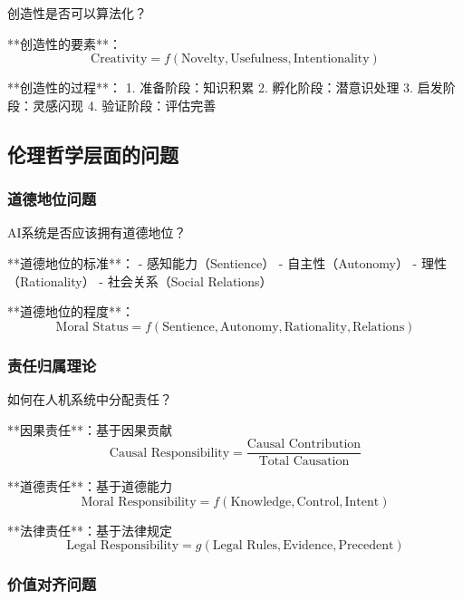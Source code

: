 创造性是否可以算法化？

**创造性的要素**：
\begin{equation}
\text{Creativity} = f(\text{Novelty}, \text{Usefulness}, \text{Intentionality})
\end{equation}

**创造性的过程**：
1. 准备阶段：知识积累
2. 孵化阶段：潜意识处理
3. 启发阶段：灵感闪现
4. 验证阶段：评估完善

\subsection{伦理哲学层面的问题}

\subsubsection{道德地位问题}

AI系统是否应该拥有道德地位？

**道德地位的标准**：
- 感知能力（Sentience）
- 自主性（Autonomy）
- 理性（Rationality）
- 社会关系（Social Relations）

**道德地位的程度**：
\begin{equation}
\text{Moral Status} = f(\text{Sentience}, \text{Autonomy}, \text{Rationality}, \text{Relations})
\end{equation}

\subsubsection{责任归属理论}

如何在人机系统中分配责任？

**因果责任**：基于因果贡献
\begin{equation}
\text{Causal Responsibility} = \frac{\text{Causal Contribution}}{\text{Total Causation}}
\end{equation}

**道德责任**：基于道德能力
\begin{equation}
\text{Moral Responsibility} = f(\text{Knowledge}, \text{Control}, \text{Intent})
\end{equation}

**法律责任**：基于法律规定
\begin{equation}
\text{Legal Responsibility} = g(\text{Legal Rules}, \text{Evidence}, \text{Precedent})
\end{equation}

\subsubsection{价值对齐问题}

